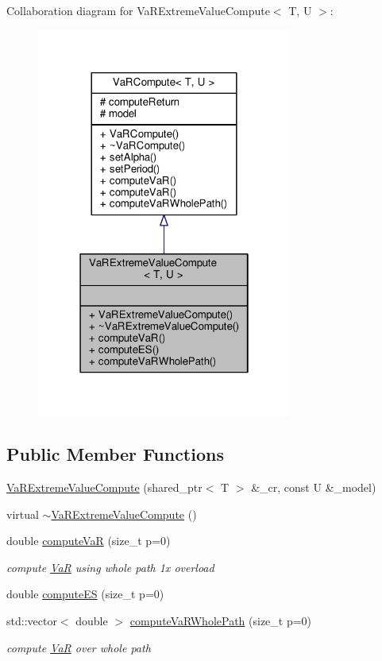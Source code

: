 Collaboration diagram for Va\+R\+Extreme\+Value\+Compute$<$ T, U $>$\+:
\nopagebreak
\begin{figure}[H]
\begin{center}
\leavevmode
\includegraphics[width=238pt]{classVaRExtremeValueCompute__coll__graph}
\end{center}
\end{figure}
\subsection*{Public Member Functions}
\begin{DoxyCompactItemize}
\item 
\hyperlink{classVaRExtremeValueCompute_ac6a44f45d19035602c3bf885466597bb}{Va\+R\+Extreme\+Value\+Compute} (shared\+\_\+ptr$<$ T $>$ \&\+\_\+cr, const U \&\+\_\+model)
\item 
virtual \hyperlink{classVaRExtremeValueCompute_a84bce72bd46b30a48fc6e86bb72201f9}{$\sim$\+Va\+R\+Extreme\+Value\+Compute} ()
\item 
double \hyperlink{classVaRExtremeValueCompute_aa0a5cedce7a1a0dc0298f5b59add0e2c}{compute\+VaR} (size\+\_\+t p=0)
\begin{DoxyCompactList}\small\item\em compute \hyperlink{classVaR}{VaR} using whole path 1x overload \end{DoxyCompactList}\item 
double \hyperlink{classVaRExtremeValueCompute_afa071fb24b112d282847f8ad6732060f}{compute\+ES} (size\+\_\+t p=0)
\item 
std\+::vector$<$ double $>$ \hyperlink{classVaRExtremeValueCompute_ad3b7ec9abcd6f6b27c89cf77e0099d18}{compute\+Va\+R\+Whole\+Path} (size\+\_\+t p=0)
\begin{DoxyCompactList}\small\item\em compute \hyperlink{classVaR}{VaR} over whole path \end{DoxyCompactList}\end{DoxyCompactItemize}
